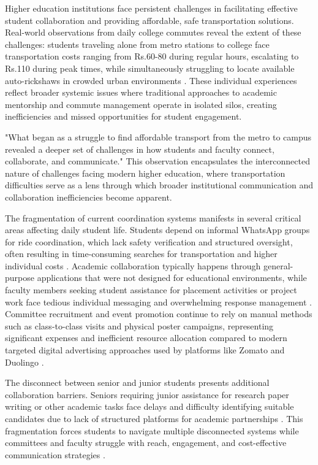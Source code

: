 \documentclass[conference]{IEEEtran}
\begin{document}
Higher education institutions face persistent challenges in facilitating effective student collaboration and providing affordable, safe transportation solutions. Real-world observations from daily college commutes reveal the extent of these challenges: students traveling alone from metro stations to college face transportation costs ranging from Rs.60-80 during regular hours, escalating to Rs.110 during peak times, while simultaneously struggling to locate available auto-rickshaws in crowded urban environments \cite{ref1}\cite{ref2}. These individual experiences reflect broader systemic issues where traditional approaches to academic mentorship and commute management operate in isolated silos, creating inefficiencies and missed opportunities for student engagement.

"What began as a struggle to find affordable transport from the metro to campus revealed a deeper set of challenges in how students and faculty connect, collaborate, and communicate." This observation encapsulates the interconnected nature of challenges facing modern higher education, where transportation difficulties serve as a lens through which broader institutional communication and collaboration inefficiencies become apparent.

The fragmentation of current coordination systems manifests in several critical areas affecting daily student life. Students depend on informal WhatsApp groups for ride coordination, which lack safety verification and structured oversight, often resulting in time-consuming searches for transportation and higher individual costs \cite{ref3}\cite{ref4}. Academic collaboration typically happens through general-purpose applications that were not designed for educational environments, while faculty members seeking student assistance for placement activities or project work face tedious individual messaging and overwhelming response management \cite{ref5}\cite{ref6}. Committee recruitment and event promotion continue to rely on manual methods such as class-to-class visits and physical poster campaigns, representing significant expenses and inefficient resource allocation compared to modern targeted digital advertising approaches used by platforms like Zomato and Duolingo \cite{ref7}\cite{ref8}.

The disconnect between senior and junior students presents additional collaboration barriers. Seniors requiring junior assistance for research paper writing or other academic tasks face delays and difficulty identifying suitable candidates due to lack of structured platforms for academic partnerships \cite{ref9}\cite{ref10}. This fragmentation forces students to navigate multiple disconnected systems while committees and faculty struggle with reach, engagement, and cost-effective communication strategies \cite{ref11}\cite{ref12}.
\end{document}
